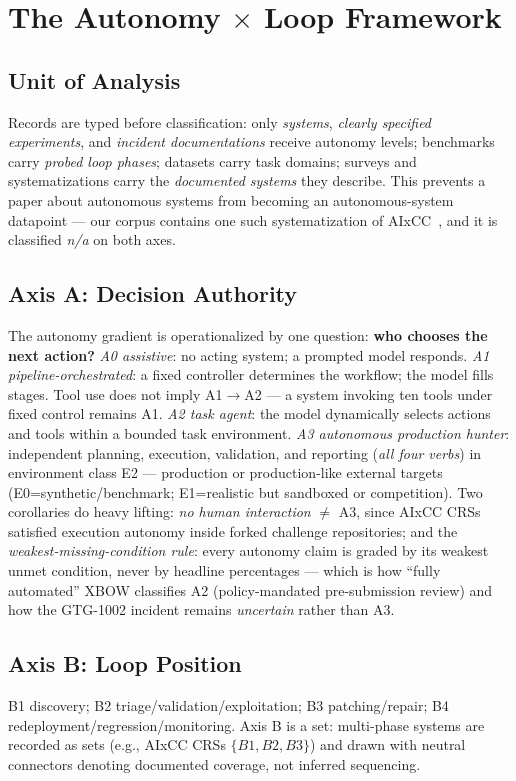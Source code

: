 \section{The Autonomy $\times$ Loop Framework}
\label{sec:framework}

\subsection{Unit of Analysis}
Records are typed before classification: only \emph{systems}, \emph{clearly specified
experiments}, and \emph{incident documentations} receive autonomy levels; benchmarks carry
\emph{probed loop phases}; datasets carry task domains; surveys and systematizations carry the
\emph{documented systems} they describe. This prevents a paper about autonomous systems from
becoming an autonomous-system datapoint --- our corpus contains one such systematization of
AIxCC~\cite{r7sokaixcc2026}, and it is classified \emph{n/a} on both axes.

\subsection{Axis A: Decision Authority}
The autonomy gradient is operationalized by one question: \textbf{who chooses the next action?}
\emph{A0 assistive}: no acting system; a prompted model responds. \emph{A1
pipeline-orchestrated}: a fixed controller determines the workflow; the model fills stages.
Tool use does not imply A1$\rightarrow$A2 --- a system invoking ten tools under fixed control
remains A1. \emph{A2 task agent}: the model dynamically selects actions and tools within a
bounded task environment. \emph{A3 autonomous production hunter}: independent planning,
execution, validation, and reporting (\emph{all four verbs}) in environment class E2 ---
production or production-like external targets (E0=synthetic/benchmark; E1=realistic but
sandboxed or competition). Two corollaries do heavy lifting: \emph{no human interaction}
$\neq$ A3, since AIxCC CRSs satisfied execution autonomy inside forked challenge repositories;
and the \emph{weakest-missing-condition rule}: every autonomy claim is graded by its weakest
unmet condition, never by headline percentages --- which is how ``fully automated'' XBOW
classifies A2 (policy-mandated pre-submission review) and how the GTG-1002 incident remains
\emph{uncertain} rather than A3.

\subsection{Axis B: Loop Position}
B1 discovery; B2 triage/validation/exploitation; B3 patching/repair; B4
redeployment/regression/monitoring. Axis B is a set: multi-phase systems are recorded as sets
(e.g., AIxCC CRSs $\{B1,B2,B3\}$) and drawn with neutral connectors denoting documented
coverage, not inferred sequencing.

